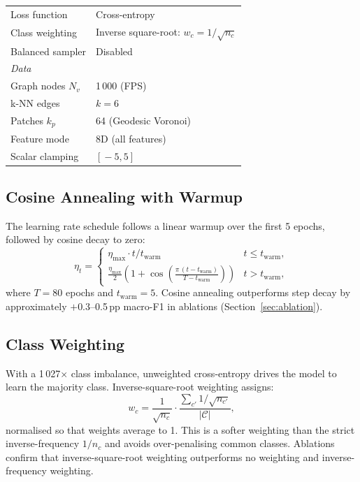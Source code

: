 \begin{table}[h]
\begin{tabular}{ll}
    \quad Loss function          & Cross-entropy \\
    \quad Class weighting        & Inverse square-root: $w_c = 1/\sqrt{n_c}$ \\
    \quad Balanced sampler       & Disabled \\
    \midrule
    \multicolumn{2}{l}{\textit{Data}} \\
    \quad Graph nodes $N_v$      & 1\,000 (FPS) \\
    \quad k-NN edges             & $k = 6$ \\
    \quad Patches $k_p$          & 64 (Geodesic Voronoi) \\
    \quad Feature mode           & 8D (all features) \\
    \quad Scalar clamping        & $[\!-5, 5\!]$ \\
    \bottomrule
  \end{tabular}
\end{table}

\subsection{Cosine Annealing with Warmup}

The learning rate schedule follows a linear warmup over the first 5 epochs,
followed by cosine decay to zero:
\begin{equation}
  \eta_t =
  \begin{cases}
    \eta_\text{max} \cdot t / t_\text{warm} & t \leq t_\text{warm}, \\
    \frac{\eta_\text{max}}{2}\!\left(1 + \cos\!\left(\frac{\pi\,(t - t_\text{warm})}{T - t_\text{warm}}\right)\right) & t > t_\text{warm},
  \end{cases}
  \label{eq:lr_schedule}
\end{equation}
where $T = 80$ epochs and $t_\text{warm} = 5$.
Cosine annealing outperforms step decay by approximately $+$0.3--0.5\,pp
macro-F1 in ablations (Section~\ref{sec:ablation}).

\subsection{Class Weighting}

With a 1\,027$\times$ class imbalance, unweighted cross-entropy drives the
model to learn the majority class.
Inverse-square-root weighting assigns:
\begin{equation}
  w_c = \frac{1}{\sqrt{n_c}} \cdot \frac{\sum_{c'} 1/\sqrt{n_{c'}}}{|\mathcal{C}|},
  \label{eq:class_weight}
\end{equation}
normalised so that weights average to 1.
This is a softer weighting than the strict inverse-frequency
$1/n_c$ and avoids over-penalising common classes.
Ablations confirm that inverse-square-root weighting outperforms no weighting
and inverse-frequency weighting.

